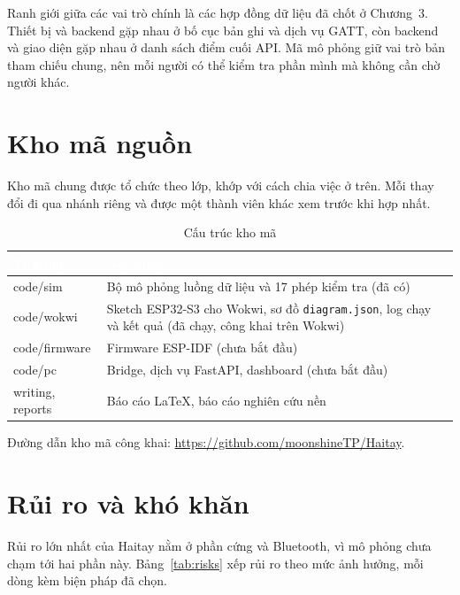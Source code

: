 Ranh giới giữa các vai trò chính là các hợp đồng dữ liệu đã chốt ở Chương~3. Thiết bị và backend gặp nhau ở bố cục bản ghi và dịch vụ GATT, còn backend và giao diện gặp nhau ở danh sách điểm cuối API. Mã mô phỏng giữ vai trò bản tham chiếu chung, nên mỗi người có thể kiểm tra phần mình mà không cần chờ người khác.

\section{Kho mã nguồn}
Kho mã chung được tổ chức theo lớp, khớp với cách chia việc ở trên. Mỗi thay đổi đi qua nhánh riêng và được một thành viên khác xem trước khi hợp nhất.

\begin{table}[H]
    \centering
    \small
    \renewcommand{\arraystretch}{1.35}
    \caption{Cấu trúc kho mã}
    \label{tab:repo}
    \begin{tabular}{>{\ttfamily\raggedright\arraybackslash}m{3.4cm} >{\raggedright\arraybackslash}m{10.6cm}}
        \toprule
        \rowcolor{haitayblue}
        \textcolor{white}{Thư mục} & \textcolor{white}{Nội dung} \\
        \midrule
        \rowcolor{haitayblue!8}
        code/sim & Bộ mô phỏng luồng dữ liệu và 17 phép kiểm tra (đã có) \\
        code/wokwi & Sketch ESP32-S3 cho Wokwi, sơ đồ \texttt{diagram.json}, log chạy và kết quả (đã chạy, công khai trên Wokwi) \\
        \rowcolor{haitayblue!8}
        code/firmware & Firmware ESP-IDF (chưa bắt đầu) \\
        code/pc & Bridge, dịch vụ FastAPI, dashboard (chưa bắt đầu) \\
        \rowcolor{haitayblue!8}
        writing, reports & Báo cáo LaTeX, báo cáo nghiên cứu nền \\
        \bottomrule
    \end{tabular}
\end{table}

Đường dẫn kho mã công khai: \url{https://github.com/moonshineTP/Haitay}.

\section{Rủi ro và khó khăn}
Rủi ro lớn nhất của Haitay nằm ở phần cứng và Bluetooth, vì mô phỏng chưa chạm tới hai phần này. Bảng~\ref{tab:risks} xếp rủi ro theo mức ảnh hưởng, mỗi dòng kèm biện pháp đã chọn.


